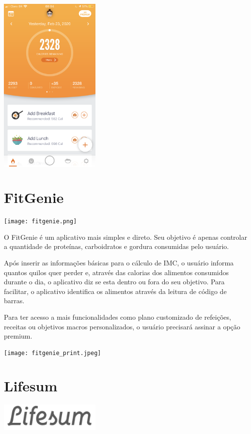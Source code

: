 \documentclass[a4paper, 11pt]{article}
\begin{document}
\begin{center}
    \includegraphics[width=5cm]{calories_mama_print.png}
\end{center} 
\newpage

\section{FitGenie}
\begin{center}
    \texttt{[image: fitgenie.png]}
\end{center} 

O \textsf{FitGenie} é um aplicativo mais simples e direto. Seu objetivo é apenas controlar a quantidade de proteínas,  carboidratos e gordura consumidas pelo usuário.

Após inserir as informações básicas para o cálculo de IMC, o usuário informa quantos quilos quer perder e, através das calorias dos alimentos consumidos durante o dia, o aplicativo diz se esta dentro ou fora do seu objetivo. Para facilitar, o aplicativo identifica os alimentos através da leitura de código de barras.

Para ter acesso a mais funcionalidades como plano customizado de refeições, receitas ou objetivos macros personalizados, o usuário precisará assinar a opção premium.

\begin{center}
    \texttt{[image: fitgenie\_print.jpeg]}
\end{center} 
\newpage

\section{Lifesum}
\begin{center}
    \includegraphics[width=5cm]{lifesum.png}
\end{center} 
\end{document}

